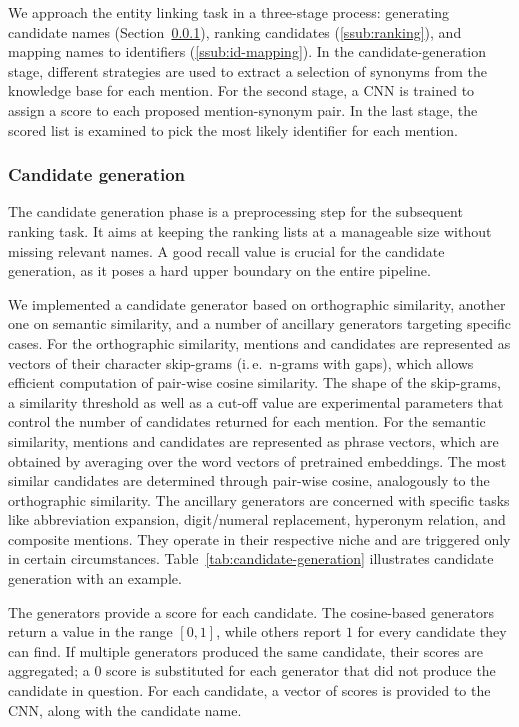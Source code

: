\documentclass{bioinfo}
\newcommand{\ie}{i.\,e.\ }
\begin{document}
We approach the entity linking task in a three-stage process:
generating candidate names (Section~\ref{ssub:cand-gen}),
ranking candidates (\ref{ssub:ranking}), and
mapping names to identifiers (\ref{ssub:id-mapping}).
In the candidate-generation stage, different strategies are used to extract a selection of synonyms from the knowledge base for each mention.
For the second stage, a CNN is trained to assign a score to each proposed mention-synonym pair.
In the last stage, the scored list is examined to pick the most likely identifier for each mention.

\subsubsection{Candidate generation}
\label{ssub:cand-gen}

The candidate generation phase is a preprocessing step for the subsequent ranking task.
It aims at keeping the ranking lists at a manageable size without missing relevant names.
A good recall value is crucial for the candidate generation, as it poses a hard upper boundary on the entire pipeline.

We implemented a candidate generator based on orthographic similarity, another one on semantic similarity, and a number of ancillary generators targeting specific cases.
For the orthographic similarity, mentions and candidates are represented as vectors of their character skip-grams (\ie n-grams with gaps),  %
which allows efficient computation of pair-wise cosine similarity.
The shape of the skip-grams, a similarity threshold as well as a cut-off value are experimental parameters that control the number of candidates returned for each mention.
For the semantic similarity, mentions and candidates are represented as phrase vectors, which are obtained by averaging over the word vectors of pretrained embeddings.
The most similar candidates are determined through pair-wise cosine, analogously to the orthographic similarity.
The ancillary generators are concerned with specific tasks like abbreviation expansion, digit/numeral replacement, hyperonym relation, and composite mentions.
They operate in their respective niche and are triggered only in certain circumstances.
Table~\ref{tab:candidate-generation} illustrates candidate generation with an example.

The generators provide a score for each candidate.
The cosine-based generators return a value in the range $[0,1]$, while others report $1$ for every candidate they can find.
If multiple generators produced the same candidate, their scores are aggregated; a $0$ score is substituted for each generator that did not produce the candidate in question.
For each candidate, a vector of scores is provided to the CNN, along with the candidate name.
\end{document}
